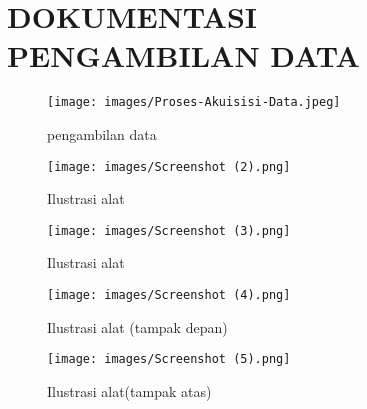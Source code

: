 \chapter{DOKUMENTASI PENGAMBILAN DATA}
\begin{figure}[!htbp]
    \centering
    \texttt{[image: images/Proses-Akuisisi-Data.jpeg]}
    \caption{pengambilan data}
    \citep{ajitot2024koefisien}
    \label{fig:pengambilan-data}
\end{figure}
\begin{figure}[!htbp]
    \centering
    \texttt{[image: images/Screenshot (2).png]}
    \caption{Ilustrasi alat}
    \label{fig:ilustrasi-alat-1}
\end{figure}
\begin{figure}[!htbp]
    \centering
    \texttt{[image: images/Screenshot (3).png]}
    \caption{Ilustrasi alat}
    \label{fig:ilustrasi-alat-2}
\end{figure}
\begin{figure}[!htbp]
    \centering
    \texttt{[image: images/Screenshot (4).png]}
    \caption{Ilustrasi alat (tampak depan)}
    \label{fig:ilustrasi-alat-depan}
\end{figure}
\begin{figure}[!htbp]
    \centering
    \texttt{[image: images/Screenshot (5).png]}
    \caption{Ilustrasi alat(tampak atas)}
    \label{fig:ilustrasi-alat-atas}
\end{figure}

